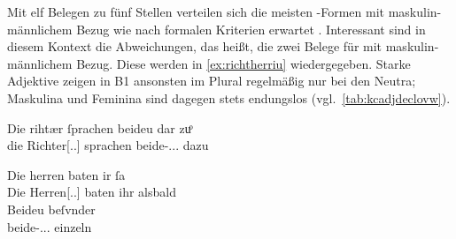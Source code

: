 Mit elf Belegen zu fünf Stellen verteilen sich die meisten
-Formen mit maskulin-männlichem Bezug wie nach formalen Kriterien
erwartet \autocite[vgl.][182]{ksw2}. Interessant sind in diesem Kontext die
Abweichungen, das heißt, die zwei Belege für  mit
maskulin-männlichem Bezug. Diese werden in \cref{ex:richtherriu} wiedergegeben.
Starke Adjektive zeigen in B1 ansonsten  im Plural
regel\-mäßig nur bei den Neutra; Maskulina und Feminina sind dagegen stets
endungslos (vgl.~\cref{tab:kcadjdeclovw}).

\begin{exe}
\ex \label{ex:richtherriu}
	\begin{xlist}
	\ex \gll Die rihtær ſprachen beideu {dar zuͦ} \\
			die Richter[\Nom.\Pl.\MascM] sprachen beide-\Nom.\Pl.\NeutM.\St{}
			dazu \\
		\begin{taggedline}{\parencites[\pno~28ra,8]{kc:B1}[vgl.~abweichend][10090]{schroeder1895}} %
		\trans {}
		\end{taggedline}
		\label{ex:richtherriu_1}

	\ex \gll Die herren baten ir ſa \\
			Die Herren[\Nom.\Pl.\MascM] baten ihr alsbald \\
	\sn \gll Beideu beſvnder \\
			beide-\Nom.\Pl.\NeutM.\St{} einzeln \\
		\begin{taggedline}{\parencites[\pno~31va,48--49]{kc:B1}[vgl.][11385--11386]{schroeder1895}} %
		\trans {}
		\end{taggedline}
		\label{ex:richtherriu_2}
	\end{xlist}
\end{exe}



